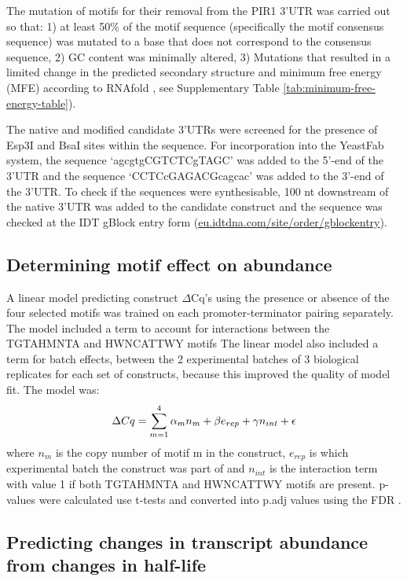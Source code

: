 \documentclass[../main.tex]{subfiles}
\begin{document}
The mutation of motifs for their removal from the PIR1 3'UTR was carried out so that: 1) at least 50\% of the motif sequence (specifically the motif consensus sequence) was mutated to a base that does not correspond to the consensus sequence,
2) GC content was minimally altered,
3) Mutations that resulted in a limited change in the predicted secondary structure and minimum free energy (MFE) according to RNAfold \parencite{Lorenz2011}, see Supplementary Table \ref{tab:minimum-free-energy-table}).

The native and modified candidate 3'UTRs were screened for the presence of Esp3I and BsaI sites within the sequence.
For incorporation into the YeastFab system, the sequence `agcgtgCGTCTCgTAGC' was added to the 5'-end of the 3'UTR and the sequence `CCTCcGAGACGcagcac' was added to the 3'-end of the 3'UTR.
To check if the sequences were synthesisable, 100 nt downstream of the native 3'UTR was added to the candidate construct and the sequence was checked at the IDT gBlock entry form (\href{https://eu.idtdna.com/site/order/gblockentry}{eu.idtdna.com/site/order/gblockentry}).

\subsection{Determining motif effect on abundance}

A linear model predicting construct \(\Delta\)Cq's using the presence or absence of the four selected motifs was trained on each promoter-terminator pairing separately.
The model included a term to account for interactions between the TGTAHMNTA and HWNCATTWY motifs
The linear model also included a term for batch effects, between the 2 experimental batches of 3 biological replicates for each set of constructs, because this improved the quality of model fit.
The model was:
\[\Delta Cq = \sum_{m=1}^4\alpha_mn_{m} + \beta \space e_{rep} + \gamma \space n_{int}+ \epsilon\]
where \(n_m\) is the copy number of motif m in the construct, \(e_{rep}\) is which experimental batch the construct was part of and \(n_{int}\) is the interaction term with value 1 if both TGTAHMNTA and HWNCATTWY motifs are present.
p-values were calculated use t-tests and converted into p.adj values using the FDR \parencite{Benjamini1995}.

\subsection{Predicting changes in transcript abundance from changes in half-life}
\end{document}
